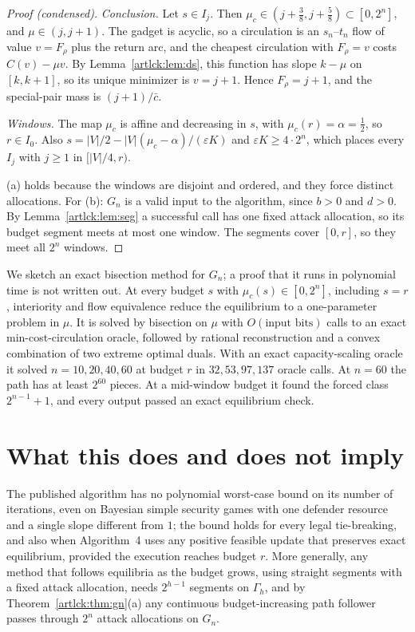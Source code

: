 \begin{proof}[Proof (condensed)]
\emph{Conclusion.} Let $s\in I_j$. Then $\mu_c\in(j+\frac38,j+\frac58)\subset[0,2^n]$, and
$\mu\in(j,j+1)$. The gadget is acyclic, so a circulation is an $s_n$--$t_n$ flow of value $v=F_\rho$ plus
the return arc, and the cheapest circulation with $F_\rho=v$ costs $C(v)-\mu v$. By
Lemma~\ref{artlck:lem:ds}, this function has slope $k-\mu$ on $[k,k+1]$, so its unique minimizer is
$v=j+1$. Hence $F_\rho=j+1$, and the special-pair mass is $(j+1)/\bar c$.

\emph{Windows.} The map $\mu_c$ is affine and decreasing in $s$, with $\mu_c(r)=\alpha=\frac12$, so
$r\in I_0$. Also $s=|V|/2-|V|(\mu_c-\alpha)/(\varepsilon K)$ and $\varepsilon K\ge4\cdot2^n$, which places
every $I_j$ with $j\ge1$ in $[|V|/4,r)$.

(a) holds because the windows are disjoint and ordered, and they force distinct allocations. For (b):
$G_n$ is a valid input to the algorithm, since $b>0$ and $d>0$. By Lemma~\ref{artlck:lem:seg} a
successful call has one fixed attack allocation, so its budget segment meets at most one window. The
segments cover $[0,r]$, so they meet all $2^n$ windows.
\end{proof}

\begin{remark}\label{artlck:rem:gn-easy}
We sketch an exact bisection method for $G_n$; a proof that it runs in polynomial time is not written out. At
every budget $s$ with $\mu_c(s)\in[0,2^n]$, including $s=r$, interiority and flow equivalence reduce the
equilibrium to a one-parameter problem in $\mu$. It is solved by bisection on $\mu$ with
$O(\text{input bits})$ calls to an exact min-cost-circulation oracle, followed by rational reconstruction
and a convex combination of two extreme optimal duals. With an exact capacity-scaling oracle it solved
$n=10,20,40,60$ at budget $r$ in $32,53,97,137$ oracle calls. At $n=60$ the path has at least $2^{60}$
pieces. At a mid-window budget it found the forced class $2^{n-1}+1$, and every output passed an exact
equilibrium check.
\end{remark}

\section{What this does and does not imply}\label{artlck:sec:implies}

The published algorithm has no polynomial worst-case bound on its number of iterations, even on Bayesian
simple security games with one defender resource and a single slope different from $1$; the bound holds
for every legal tie-breaking, and also when Algorithm~4 uses any positive feasible update that
preserves exact equilibrium, provided the execution reaches budget $r$. More generally, any method
that follows equilibria as the budget grows, using straight segments with a fixed attack allocation,
needs $2^{h-1}$ segments on $\Gamma_h$, and by Theorem~\ref{artlck:thm:gn}(a) any continuous
budget-increasing path follower passes through $2^n$ attack allocations on $G_n$.

